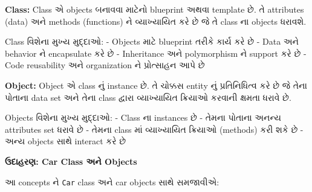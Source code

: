 \textbf{Class:} Class એ objects બનાવવા માટેનો blueprint અથવા template છે.
તે attributes (data) અને methods (functions) ને વ્યાખ્યાયિત કરે છે જે તે class ના
objects ધરાવશે.

Class વિશેના મુખ્ય મુદ્દાઓ: - Objects માટે blueprint તરીકે કાર્ય કરે છે - Data અને
behavior ને encapsulate કરે છે - Inheritance અને polymorphism ને support કરે છે
- Code reusability અને organization ને પ્રોત્સાહન આપે છે

\textbf{Object:} Object એ class નું instance છે. તે ચોક્કસ entity નું
પ્રતિનિધિત્વ કરે છે જે તેના પોતાના data set અને તેના class દ્વારા વ્યાખ્યાયિત
ક્રિયાઓ કરવાની ક્ષમતા ધરાવે છે.

Objects વિશેના મુખ્ય મુદ્દાઓ: - Class ના instances છે - તેમના પોતાના અનન્ય
attributes set ધરાવે છે - તેમના class માં વ્યાખ્યાયિત ક્રિયાઓ (methods) કરી શકે
છે - અન્ય objects સાથે interact કરે છે

\textbf{ઉદાહરણ: Car Class અને Objects}

આ concepts ને \texttt{Car} class અને car objects સાથે સમજાવીએ:


